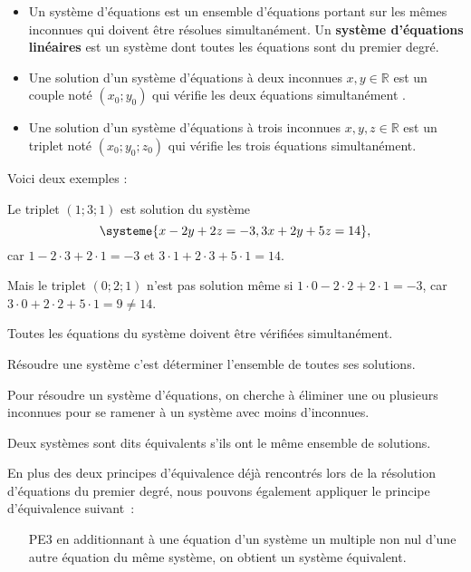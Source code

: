 \documentclass[a4paper,12pt]{report}
\begin{document}
\begin{boiteicone}
	\begin{itemize}
		\item Un système d'équations est un ensemble d'équations portant sur les mêmes inconnues qui doivent être résolues simultanément. Un {\bfseries système d'équations linéaires} est un système dont toutes les équations sont du premier degré.
		\item Une solution d'un système d'équations à deux inconnues $x,y\in \mathbb{R}$ est un couple noté $(x_0 ; y_0)$ qui vérifie les deux équations simultanément .
\item Une solution d'un système d'équations à trois inconnues $x , y , z\in \mathbb{R}$ est un triplet noté $(x_0 ; y_0 ; z_0)$ qui vérifie les trois équations simultanément.
	\end{itemize}
\end{boiteicone}

Voici deux exemples : 

Le triplet $(1;3;1)$ est solution du système
\[\systeme{
  x - 2y + 2z = -3,
  3x + 2y + 5z = 14
},\] car $1-2\cdot 3+2\cdot 1=-3$ et $3\cdot 1+2\cdot 3+5\cdot 1 =14$.

Mais le triplet $(0;2;1)$ n'est pas solution même si $1\cdot 0-2\cdot 2+2\cdot 1=-3$, car $3\cdot 0+2\cdot 2+5\cdot 1=9\neq 14$. 

\begin{boiteicone}
Toutes les équations du système doivent être vérifiées simultanément. 
\end{boiteicone}

Résoudre une système c'est déterminer l'ensemble de toutes ses solutions. 

Pour résoudre un système d'équations, on cherche à \og{}éliminer une ou plusieurs inconnues\fg{} pour se ramener à un système avec moins d'inconnues.


\begin{boiteicone}
Deux systèmes sont dits équivalents s'ils ont le même ensemble de solutions.
\end{boiteicone}

En plus des deux principes d'équivalence déjà rencontrés lors de la résolution d'équations du premier degré, nous pouvons également appliquer le principe d'équivalence suivant~:
\begin{enumerate}
	\item[PE3] en additionnant à une équation d'un système un multiple non nul d'une autre équation du même système, on obtient un système équivalent.
\end{enumerate}

\begin{boiteExT}[$\systeme{3x+y=4,-2x+3y=10}$]
\vspace{7cm}
\end{boiteExT}
\end{document}
